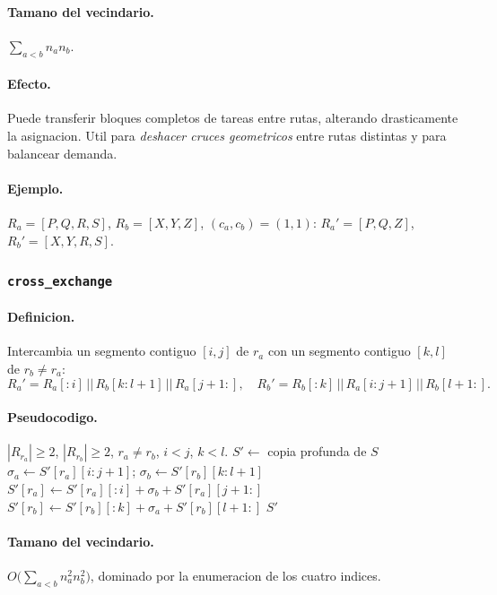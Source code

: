 \documentclass[11pt,a4paper]{article}
\newcommand{\op}[1]{\texttt{#1}}
\begin{document}
\paragraph{Tamano del vecindario.}
$\sum_{a<b} n_a n_b$.

\paragraph{Efecto.} Puede transferir bloques completos de tareas
entre rutas, alterando drasticamente la asignacion. Util para
\emph{deshacer cruces geometricos} entre rutas distintas y para
balancear demanda.

\paragraph{Ejemplo.} $R_a=[P,Q,R,S]$, $R_b=[X,Y,Z]$, $(c_a,c_b)=(1,1)$:
$R_a'=[P,Q,Z]$, $R_b'=[X,Y,R,S]$.

\subsubsection{\op{cross\_exchange}}

\paragraph{Definicion.} Intercambia un segmento contiguo $[i,j]$ de
$r_a$ con un segmento contiguo $[k,l]$ de $r_b\neq r_a$:
\[
R_a' = R_a[:i] \,||\, R_b[k:l{+}1] \,||\, R_a[j{+}1:],\quad
R_b' = R_b[:k] \,||\, R_a[i:j{+}1] \,||\, R_b[l{+}1:].
\]

\paragraph{Pseudocodigo.}
\begin{algorithm}[H]
\caption{\op{cross\_exchange}($S, r_a, i, j, r_b, k, l$)}
\begin{algorithmic}[1]
\Require $|R_{r_a}|\ge 2$, $|R_{r_b}|\ge 2$, $r_a\neq r_b$,
$i<j$, $k<l$.
\State $S' \gets$ copia profunda de $S$
\State $\sigma_a \gets S'[r_a][i:j{+}1]$;\; $\sigma_b \gets S'[r_b][k:l{+}1]$
\State $S'[r_a] \gets S'[r_a][:i] + \sigma_b + S'[r_a][j{+}1:]$
\State $S'[r_b] \gets S'[r_b][:k] + \sigma_a + S'[r_b][l{+}1:]$
\State \Return $S'$
\end{algorithmic}
\end{algorithm}

\paragraph{Tamano del vecindario.}
$O\bigl(\sum_{a<b} n_a^2 n_b^2\bigr)$, dominado por la enumeracion
de los cuatro indices.
\end{document}
